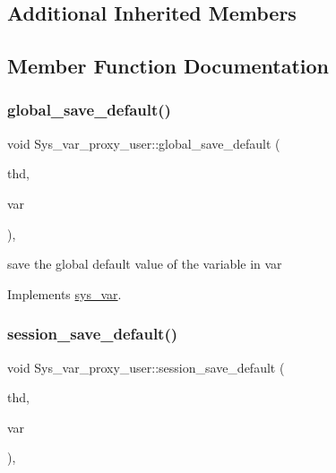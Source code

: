 \subsection*{Additional Inherited Members}


\subsection{Member Function Documentation}
\mbox{\label{classSys__var__proxy__user_a261981ce30b908f8a6f2cb697576f578}} 
\subsubsection{\texorpdfstring{global\+\_\+save\+\_\+default()}{global\_save\_default()}}
{\footnotesize\ttfamily void Sys\+\_\+var\+\_\+proxy\+\_\+user\+::global\+\_\+save\+\_\+default (\begin{DoxyParamCaption}\item[{T\+HD $\ast$}]{thd,  }\item[{\mbox{\hyperlink{classset__var}{set\+\_\+var}} $\ast$}]{var }\end{DoxyParamCaption})\hspace{0.3cm}{\ttfamily [inline]}, {\ttfamily [virtual]}}

save the global default value of the variable in var 

Implements \mbox{\hyperlink{classsys__var}{sys\+\_\+var}}.

\mbox{\label{classSys__var__proxy__user_ae35cbb27adc891da688c4428ebc7df7e}} 
\subsubsection{\texorpdfstring{session\+\_\+save\+\_\+default()}{session\_save\_default()}}
{\footnotesize\ttfamily void Sys\+\_\+var\+\_\+proxy\+\_\+user\+::session\+\_\+save\+\_\+default (\begin{DoxyParamCaption}\item[{T\+HD $\ast$}]{thd,  }\item[{\mbox{\hyperlink{classset__var}{set\+\_\+var}} $\ast$}]{var }\end{DoxyParamCaption})\hspace{0.3cm}{\ttfamily [inline]}, {\ttfamily [virtual]}}

